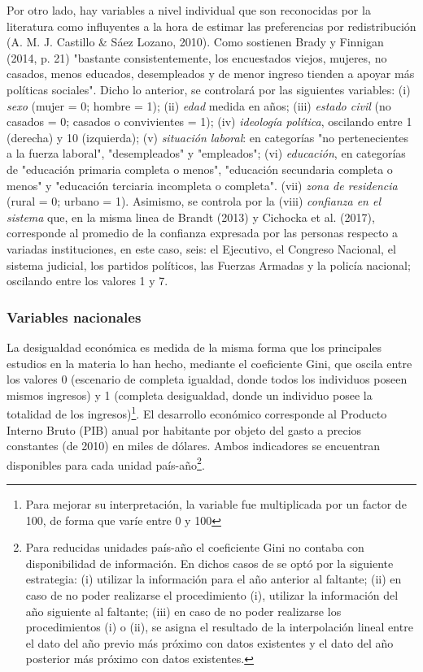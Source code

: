 \documentclass[12pt,letterpaper]{article}
\begin{document}
Por otro lado, hay variables a nivel individual que son reconocidas por la literatura como influyentes a la hora de estimar las preferencias por redistribución (A. M. J. Castillo \& Sáez Lozano, 2010). Como sostienen Brady y Finnigan (2014, p. 21) "bastante consistentemente, los encuestados viejos, mujeres, no casados, menos educados, desempleados y de menor ingreso tienden a apoyar más políticas sociales". Dicho lo anterior, se controlará por las siguientes variables: (i) \textit{sexo} (mujer = 0; hombre = 1); (ii) \textit{edad} medida en años; (iii) \textit{estado civil} (no casados = 0; casados o convivientes = 1); (iv) \textit{ideología política}, oscilando entre 1 (derecha) y 10 (izquierda); (v)  \textit{situación laboral}: en categorías "no pertenecientes a la fuerza laboral", "desempleados" y "empleados"; (vi) \textit{educación}, en categorías de "educación primaria completa o menos", "educación secundaria completa o menos" y "educación terciaria incompleta o completa". (vii) \textit{zona de residencia} (rural = 0; urbano = 1). Asimismo, se controla por la (viii) \textit{confianza en el sistema} que, en la misma linea de Brandt (2013) y Cichocka et al. (2017), corresponde al promedio de la confianza expresada por las personas respecto a variadas instituciones, en este caso, seis: el Ejecutivo, el Congreso Nacional, el sistema judicial, los partidos políticos, las Fuerzas Armadas y la policía nacional; oscilando entre los valores 1 y 7. 

\subsubsection{Variables nacionales \label{sec:sec322}}

La desigualdad económica es medida de la misma forma que los principales estudios en la materia lo han hecho, mediante el coeficiente Gini, que oscila entre los valores 0 (escenario de completa igualdad, donde todos los individuos poseen mismos ingresos) y 1 (completa desigualdad, donde un individuo posee la totalidad de los ingresos)\footnote{Para mejorar su interpretación, la variable fue multiplicada por un factor de 100, de forma que varíe entre 0 y 100}. El desarrollo económico corresponde al Producto Interno Bruto (PIB) anual por habitante por objeto del gasto a precios constantes (de 2010) en miles de dólares. Ambos indicadores se encuentran disponibles para cada unidad país-año\footnote{Para reducidas unidades país-año el coeficiente Gini no contaba con disponibilidad de información. En dichos casos de se optó por la siguiente estrategia: (i) utilizar la información para el año anterior al faltante; (ii) en caso de no poder realizarse el procedimiento (i), utilizar la información del año siguiente al faltante; (iii) en caso de no poder realizarse los procedimientos (i) o (ii), se asigna el resultado de la interpolación lineal entre el dato del año previo más próximo con datos existentes y el dato del año posterior más próximo con datos existentes.}. \\
\end{document}
